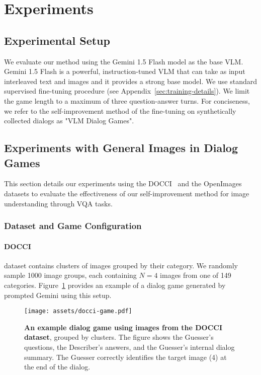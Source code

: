 \section{Experiments}
\label{sec:exps}

\subsection{Experimental Setup}
\label{sec:exps-setup}

We evaluate our method using the Gemini 1.5 Flash model \citep{gemini2024} as the base VLM. 
Gemini 1.5 Flash is a powerful, instruction-tuned VLM that can take as input interleaved text and images and it provides a strong base model.
We use standard supervised fine-tuning procedure (see Appendix~\ref{sec:training-details}).
We limit the game length to a maximum of three question-answer turns.
For conciseness, we refer to the self-improvement method of the fine-tuning on synthetically collected dialogs as "VLM Dialog Games".

\subsection{Experiments with General Images in Dialog Games}
\label{sec:exps-docci}

This section details our experiments using the DOCCI~\citep{OnoeDocci2024} and the OpenImages datasets \citep{kuznetsova2020openimages} to evaluate the effectiveness of our self-improvement method for image understanding through VQA tasks.

\subsubsection{Dataset and Game Configuration}
\label{sec:game-config}

\paragraph{DOCCI} dataset contains clusters of images grouped by their category.
We randomly sample \num{1000} image groups, each containing $N = 4$ images from one of \num{149} categories.
Figure~\ref{fig:docci_example} provides an example of a dialog game generated by prompted Gemini using this setup.

\begin{figure}[t]
    \centering
    \texttt{[image: assets/docci-game.pdf]}
    \caption{\textbf{An example dialog game using images from the DOCCI dataset}, grouped by clusters.
    The figure shows the Guesser's questions, the Describer's answers, and the Guesser's internal dialog summary.  The Guesser correctly identifies the target image (4) at the end of the dialog.}
    \vspace{-3mm}
    \label{fig:docci_example}
\end{figure}

